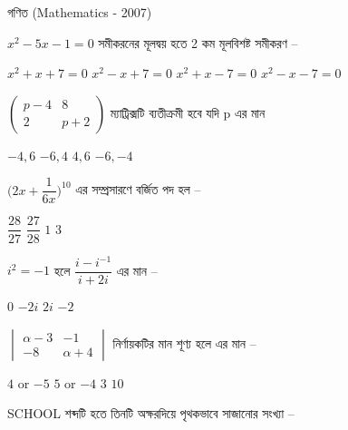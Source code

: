 \documentclass[addpoints]{exam}
\begin{document}
\begin{LARGE}
\begin{center}
গণিত (Mathematics - 2007)
\end{center}
\end{LARGE}
\begin{questions}

\question  $ x^{2}-5x-1=0 $ সমীকরনের মূলদ্বয় হতে 2 কম মূলবিশষ্ট সমীকরণ –

\begin{oneparchoices}
\choice $ x^{2}+x+7=0 $
\choice $ x^{2}-x+7=0 $
\choice $ x^{2}+x-7=0 $
\choice $ x^{2}-x-7=0 $
\end{oneparchoices}

\question $ \begin{pmatrix}
p-4 & 8\\
2 & p+2
\end{pmatrix} $ ম্যাট্রিক্সটি ব্যতীক্রমী হবে যদি p এর মান 

\begin{oneparchoices}
\choice $ -4, 6 $
\choice $-6, 4$
\choice $ 4, 6$
\choice $-6, -4$
\end{oneparchoices}

\question $ \Bigg(2x + \dfrac{1}{6x} \Bigg)^{10} $ এর সম্প্রসারণে বর্জিত পদ হল – 

\begin{oneparchoices}
\choice $ \dfrac{28}{27} $
\choice $ \dfrac{27}{28} $
\choice $ 1 $
\choice  $ 3 $
\end{oneparchoices}

\question $ i^{2}=-1 $ হলে $ \dfrac{i-i^{-1}}{i+2i} $ এর মান –


\begin{oneparchoices}
\choice $ 0 $
\choice $ -2i $
\choice $ 2i $
\choice  $ -2 $
\end{oneparchoices}

\question $ \begin{vmatrix}
\alpha -3 & -1 \\
-8 & \alpha +4
\end{vmatrix} $ নির্ণায়কটির মান শূণ্য হলে এর মান – 

\begin{oneparchoices}
\choice $ 4$ or $-5 $
\choice $ 5$ or $-4 $
\choice $ 3 $
\choice $ 10 $
\end{oneparchoices}

\question SCHOOL শব্দটি হতে তিনটি অক্ষরদিয়ে পৃথকভাবে সাজানোর সংখ্যা – 

\begin{oneparchoices}
\end{oneparchoices}


\end{questions}
\end{document}
